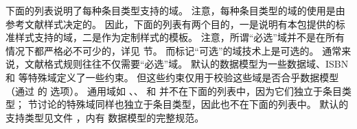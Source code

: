 
下面的列表说明了每种条目类型支持的域。
注意，每种条目类型的域的使用是由参考文献样式决定的。
因此，下面的列表有两个目的，一是说明有本包提供的标准样式支持的域，二是作为定制样式的模板。
注意，所谓“必选”域并不是在所有情况下都严格必不可少的，详见  节。
而标记“可选”的域技术上是可选的。
通常来说，文献格式规则往往不仅需要“必选”域。
默认的数据模型为一些数据域、ISBN 和  等特殊域定义了一些约束。
但这些约束仅用于校验这些域是否合乎数据模型（通过 \biber 的  选项）。
通用域如 、、 和  并不在下面的列表中，因为它们独立于条目类型；
节讨论的特殊域同样也独立于条目类型，因此也不在下面的列表中。
默认的支持类型见文件 ，内有 \biblatex 数据模型的完整规范。


